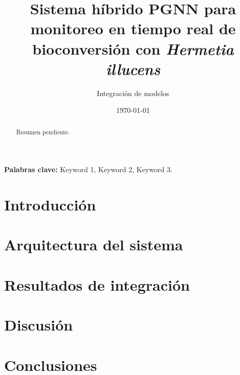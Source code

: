 \documentclass[11pt,a4paper]{article}
\title{Sistema híbrido PGNN para monitoreo en tiempo real de bioconversión con \textit{Hermetia illucens}}
\author{Integración de modelos}
\date{\today}
\begin{document}
\maketitle

\begin{abstract}
Resumen pendiente.
\end{abstract}

\vspace{0.5cm}
\noindent \textbf{Palabras clave:} Keyword 1, Keyword 2, Keyword 3.

\section{Introducción}
\section{Arquitectura del sistema}
\section{Resultados de integración}
\section{Discusión}
\section{Conclusiones}

\printbibliography
\end{document}
